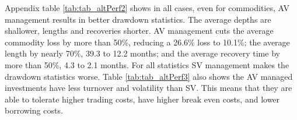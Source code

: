 
Appendix table \ref{tab:tab_altPerf2} shows in all cases, even for commodities, AV management results in better drawdown statistics. The average depths are shallower, lengths and recoveries shorter. AV management cuts the average commodity loss by more than 50\%, reducing a 26.6\% loss to 10.1\%; the average length by nearly 70\%, 39.3 to 12.2 months; and the average recovery time by more than 50\%, 4.3 to 2.1 months. For all statistics SV management makes the drawdown statistics worse. Table \ref{tab:tab_altPerf3} also shows the AV managed investments have less turnover and volatility than SV. This means that they are able to tolerate higher trading costs, have higher break even costs, and lower borrowing costs.%



